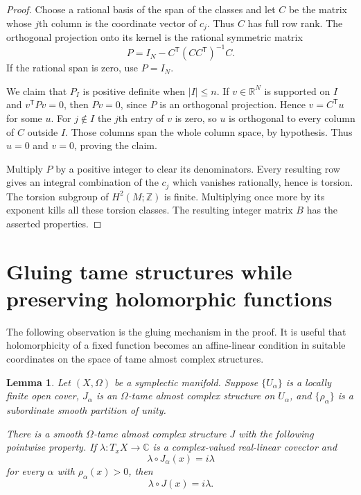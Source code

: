 \documentclass[11pt]{amsart}
\newtheorem{lemma}[theorem]{Lemma}
\theoremstyle{definition}
\theoremstyle{remark}
\newcommand{\R}{\mathbb R}
\newcommand{\C}{\mathbb C}
\newcommand{\Z}{\mathbb Z}
\begin{document}
\begin{proof}
Choose a rational basis of the span of the classes and let $C$
be the matrix whose $j$th column is the coordinate vector of
$c_j$.  Thus $C$ has full row rank.  The orthogonal projection
onto its kernel is the rational symmetric matrix
\[
P=I_N-C^{\mathsf T}(CC^{\mathsf T})^{-1}C.
\]
If the rational span is zero, use $P=I_N$.

We claim that $P_I$ is positive definite when $|I|\leq n$.
If $v\in\R^N$ is supported on $I$ and
$v^{\mathsf T}Pv=0$, then $Pv=0$, since $P$ is an orthogonal
projection.  Hence $v=C^{\mathsf T}u$ for some $u$.
For $j\notin I$ the $j$th entry of $v$ is zero, so $u$ is
orthogonal to every column of $C$ outside $I$.  Those columns
span the whole column space, by hypothesis.  Thus $u=0$ and
$v=0$, proving the claim.

Multiply $P$ by a positive integer to clear its denominators.
Every resulting row gives an integral combination of the $c_j$
which vanishes rationally, hence is torsion.  The torsion
subgroup of $H^2(M;\Z)$ is finite.  Multiplying once more by
its exponent kills all these torsion classes.  The resulting
integer matrix $B$ has the asserted properties.
\end{proof}

\section{Gluing tame structures while preserving holomorphic functions}

The following observation is the gluing mechanism in the proof.
It is useful that holomorphicity of a fixed function becomes an
affine-linear condition in suitable coordinates on the space of
tame almost complex structures.

\begin{lemma}\label{lem:tame-gluing}
Let $(X,\Omega)$ be a symplectic manifold.  Suppose $\{U_\alpha\}$
is a locally finite open cover, $J_\alpha$ is an $\Omega$-tame
almost complex structure on $U_\alpha$, and $\{\rho_\alpha\}$
is a subordinate smooth partition of unity.

There is a smooth $\Omega$-tame almost complex structure $J$
with the following pointwise property.  If
$\lambda:T_xX\to\C$ is a complex-valued real-linear covector and
\[
\lambda\circ J_\alpha(x)=i\lambda
\]
for every $\alpha$ with $\rho_\alpha(x)>0$, then
\[
\lambda\circ J(x)=i\lambda.
\]
\end{lemma}
\end{document}
